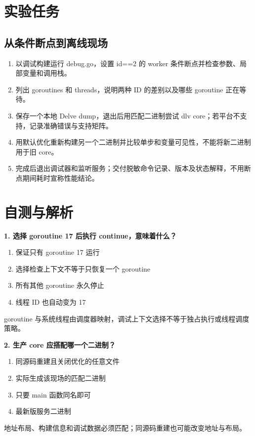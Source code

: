 \documentclass[UTF8,fontset=fandol,openany,11pt]{ctexbook}
\begin{document}
\section{实验任务}
\subsection*{从条件断点到离线现场}
\begin{enumerate}
\item 以调试构建运行 debug.go，设置 id==2 的 worker 条件断点并检查参数、局部变量和调用栈。

\item 列出 goroutines 和 threads，说明两种 ID 的差别以及哪些 goroutine 正在等待。

\item 保存一个本地 Delve dump，退出后用匹配二进制尝试 dlv core；若平台不支持，记录准确错误与支持矩阵。

\item 用默认优化重新构建另一个二进制并比较单步和变量可见性，不能将新二进制用于旧 core。

\item 完成后退出调试器和监听服务；交付脱敏命令记录、版本及状态解释，不用断点期间耗时宣称性能结论。

\end{enumerate}
\section{自测与解析}
\noindent\textbf{1. 选择 goroutine 17 后执行 continue，意味着什么？}
\begin{enumerate}[label=\Alph*.]
\item 保证只有 goroutine 17 运行
\item 选择检查上下文不等于只恢复一个 goroutine
\item 所有其他 goroutine 永久停止
\item 线程 ID 也自动变为 17
\end{enumerate}
goroutine 与系统线程由调度器映射，调试上下文选择不等于独占执行或线程调度策略。

\noindent\textbf{2. 生产 core 应搭配哪一个二进制？}
\begin{enumerate}[label=\Alph*.]
\item 同源码重建且关闭优化的任意文件
\item 实际生成该现场的匹配二进制
\item 只要 main 函数同名即可
\item 最新版服务二进制
\end{enumerate}
地址布局、构建信息和调试数据必须匹配；同源码重建也可能改变地址与布局。
\end{document}
